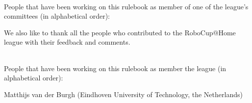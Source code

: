 ~\\\noindent People that have been working on this rulebook as member of one of the league's committees (in alphabetical order):
\begin{center}
\begin{minipage}{0.8\textwidth}
\begin{multicols}{3}%
\footnotesize
\noindent%

\end{multicols}
\end{minipage}
\end{center}

We also like to thank all the people who contributed to the RoboCup@Home league with their feedback and comments.

~\\\noindent People that have been working on this rulebook as member the league (in alphabetical order):
\begin{center}
\begin{minipage}{0.8\textwidth}
\begin{multicols}{2}%
\footnotesize
\noindent%
Matthijs van der Burgh (Eindhoven University of Technology, the Netherlands)\\
\end{multicols}
\end{minipage}
\end{center}


